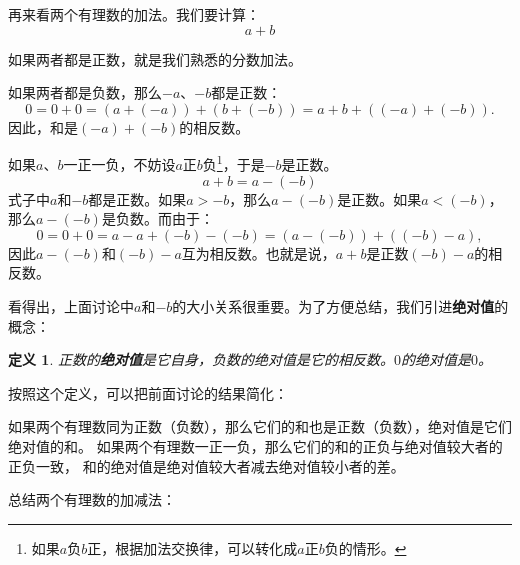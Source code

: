 \documentclass[12pt,UTF8]{ctexbook}
\newtheorem{df}{定义}[section]
\begin{document}
再来看两个有理数的加法。我们要计算：
$$ a + b $$

如果两者都是正数，就是我们熟悉的分数加法。

如果两者都是负数，那么$-a$、$-b$都是正数：
$$ 0 = 0 + 0 = (a +(-a)) + (b + (-b)) = a + b + \left((-a) + (-b)\right).$$
因此，和是$(-a) + (-b)$的相反数。

如果$a$、$b$一正一负，不妨设$a$正$b$负\footnote{如果$a$负$b$正，根据加法交换律，可以转化成$a$正$b$负的情形。}，于是$-b$是正数。
$$ a + b = a - (-b)$$
式子中$a$和$-b$都是正数。如果$a > -b$，那么$a - (-b)$是正数。如果$a < (-b)$，那么$a - (-b)$是负数。而由于：
$$ 0 = 0 + 0 = a - a + (-b) - (-b) = \left(a - (-b)\right) + \left((-b) - a\right),$$
因此$a - (-b)$和$(-b) - a$互为相反数。也就是说，$a + b$是正数$(-b) - a$的相反数。

看得出，上面讨论中$a$和$-b$的大小关系很重要。为了方便总结，我们引进\textbf{绝对值}的概念：
\begin{df}\label{df:3-0-0}
    正数的\textbf{绝对值}是它自身，负数的绝对值是它的相反数。$0$的绝对值是$0$。
\end{df}
按照这个定义，可以把前面讨论的结果简化：

如果两个有理数同为正数（负数），那么它们的和也是正数（负数），绝对值是它们绝对值的和。
如果两个有理数一正一负，那么它们的和的正负与绝对值较大者的正负一致，
和的绝对值是绝对值较大者减去绝对值较小者的差。

总结两个有理数的加减法：
\begin{center}
\end{center}
\end{document}
